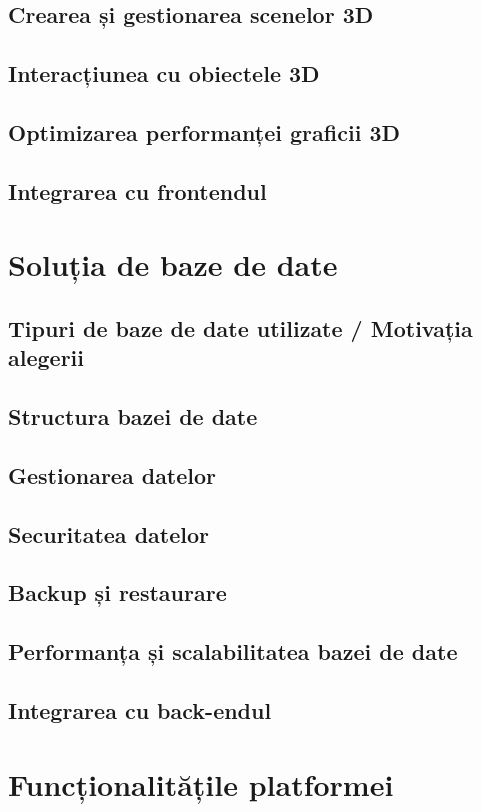 \subsection{Crearea și gestionarea scenelor 3D}
\subsection{Interacțiunea cu obiectele 3D}
\subsection{Optimizarea performanței graficii 3D}
\subsection{Integrarea cu frontendul}

\section{Soluția de baze de date}
\label{sec:proj-database}
\subsection{Tipuri de baze de date utilizate / Motivația alegerii}
\subsection{Structura bazei de date}
\subsection{Gestionarea datelor}
\subsection{Securitatea datelor}
\subsection{Backup și restaurare}
\subsection{Performanța și scalabilitatea bazei de date}
\subsection{Integrarea cu back-endul}

\section{Funcționalitățile platformei}
\label{sec:proj-features}

